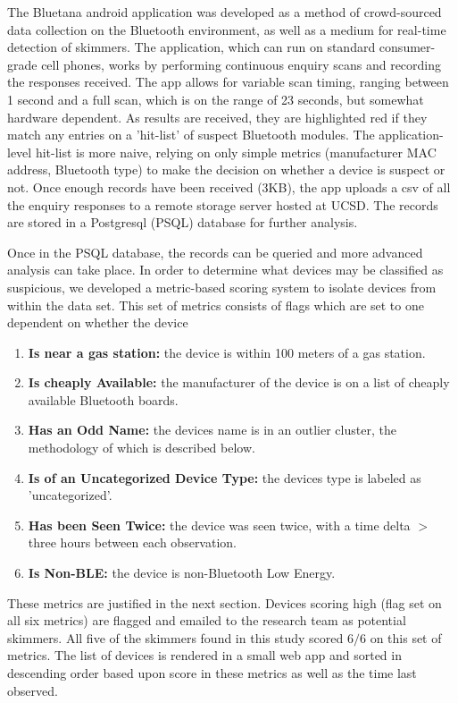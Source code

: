 The Bluetana android application was developed as a method of crowd-sourced data collection on the Bluetooth environment, as well as a medium for real-time detection of skimmers. The application, which can run on standard consumer-grade cell phones, works by performing continuous enquiry scans and recording the responses received. The app allows for variable scan timing, ranging between 1 second and a full scan, which is on the range of 23 seconds, but somewhat hardware dependent. As results are received, they are highlighted red if they match any entries on a 'hit-list' of suspect Bluetooth modules. The application-level hit-list is more naive, relying on only simple metrics (manufacturer MAC address, Bluetooth type) to make the decision on whether a device is suspect or not. Once enough records have been received (3KB), the app uploads a csv of all the enquiry responses to a remote storage server hosted at UCSD. The records are stored in a Postgresql (PSQL) database for further analysis.

Once in the PSQL database, the records can be queried and more advanced analysis can take place. In order to determine what devices may be classified as suspicious, we developed a metric-based scoring system to isolate devices from within the data set. This set of metrics consists of flags which are set to one dependent on whether the device

\begin{enumerate}
\item \textbf{Is near a gas station:} the device is within 100 meters of a gas station.
\item \textbf{Is cheaply Available:} the manufacturer of the device is on a list of cheaply available Bluetooth boards.
\item \textbf{Has an Odd Name:} the devices name is in an outlier cluster, the methodology of which is described below.
\item \textbf{Is of an Uncategorized Device Type:} the devices type is labeled as 'uncategorized'.
\item \textbf{Has been Seen Twice:} the device was seen twice, with a time delta $>$ three hours between each observation.
\item \textbf{Is Non-BLE:} the device is non-Bluetooth Low Energy.
\end{enumerate}

These metrics are justified in the next section. Devices scoring high (flag set on all six metrics) are flagged and emailed to the research team as potential skimmers. All five of the skimmers found in this study scored $6/6$ on this set of metrics. The list of devices is rendered in a small web app and sorted in descending order based upon score in these metrics as well as the time last observed.

\fi
